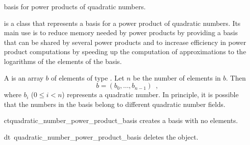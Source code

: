 

\NAME

 \dotfill
basis for power products of quadratic numbers.



\ABSTRACT

 is a class that represents a basis for a power
product of quadratic numbers.  Its main use is to reduce memory needed by power products by
providing a basis that can be shared by several power products and to increase efficiency in
power product computations by speeding up the computation of approximations to the logarithms of
the elements of the basis.



\DESCRIPTION

A  is an array $b$ of elements of type
.  Let $n$ be the number of elements
in $b$.  Then
\begin{displaymath}
  b = (b_{0}, \dots, b_{n-1}) \enspace,
\end{displaymath}
where $b_{i}$ ($0\leq i < n$) represents a quadratic number.  In principle, it is possible that
the numbers in the basis belong to different quadratic number fields.



\CONS

\begin{fcode}{ct}{quadratic_number_power_product_basis}{}
  creates a basis with no elements.
\end{fcode}

\begin{fcode}{dt}{~quadratic_number_power_product_basis}{}
  deletes the object.
\end{fcode}



